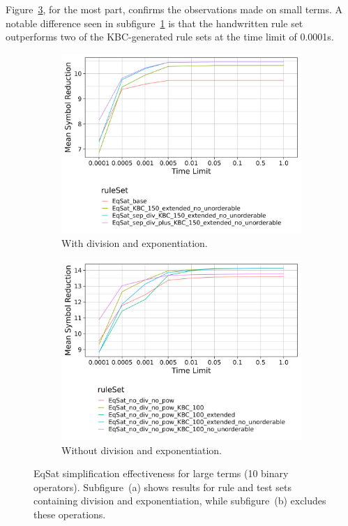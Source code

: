 Figure~\ref{fig:eqsat_large_comparison}, for the most part, confirms the observations made on small terms. A notable difference seen in subfigure~\ref{fig:eqsat_large_with_div} is that the handwritten rule set outperforms two of the KBC-generated rule sets at the time limit of 0.0001s.

\begin{figure}[h]
	\centering
	\begin{subfigure}[t]{0.48\textwidth}
		\includegraphics[width=\linewidth]{img/by_rule_set_random_terms_large.png}
		\caption{With division and exponentiation.}
		\label{fig:eqsat_large_with_div}
	\end{subfigure}\hfill
	\begin{subfigure}[t]{0.48\textwidth}
		\includegraphics[width=\linewidth]{img/by_rule_set_no_div_no_pow_random_terms_large.png}
		\caption{Without division and exponentiation.}
		\label{fig:eqsat_large_no_div}
	\end{subfigure}
	\caption{
		EqSat simplification effectiveness for large terms (10 binary operators).
		Subfigure~(a) shows results for rule and test sets containing division and exponentiation, 
		while subfigure~(b) excludes these operations.
	}
	\label{fig:eqsat_large_comparison}
\end{figure}

